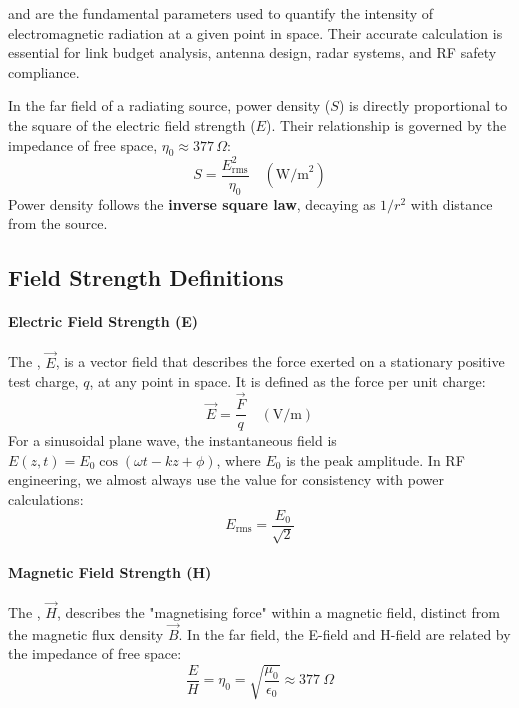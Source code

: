  and  are the fundamental parameters used to quantify the intensity of electromagnetic radiation at a given point in space. Their accurate calculation is essential for link budget analysis, antenna design, radar systems, and RF safety compliance.

\begin{keyconcept}
    In the far field of a radiating source, power density ($S$) is directly proportional to the square of the electric field strength ($E$). Their relationship is governed by the impedance of free space, $\eta_0 \approx 377\,\Omega$:
    \[
        S = \frac{E_{\text{rms}}^2}{\eta_0} \quad (\text{W/m}^2)
    \]
    Power density follows the \textbf{inverse square law}, decaying as $1/r^2$ with distance from the source.
\end{keyconcept}

\subsection{Field Strength Definitions}

\paragraph{Electric Field Strength (E)}
The , $\vec{E}$, is a vector field that describes the force exerted on a stationary positive test charge, $q$, at any point in space. It is defined as the force per unit charge:
\begin{equation}
    \vec{E} = \frac{\vec{F}}{q} \quad (\text{V/m})
\end{equation}
For a sinusoidal plane wave, the instantaneous field is $E(z,t) = E_0 \cos(\omega t - kz + \phi)$, where $E_0$ is the peak amplitude. In RF engineering, we almost always use the  value for consistency with power calculations:
\begin{equation}
    E_{\text{rms}} = \frac{E_0}{\sqrt{2}}
\end{equation}

\paragraph{Magnetic Field Strength (H)}
The , $\vec{H}$, describes the "magnetising force" within a magnetic field, distinct from the magnetic flux density $\vec{B}$. In the far field, the E-field and H-field are related by the impedance of free space:
\begin{equation}
    \frac{E}{H} = \eta_0 = \sqrt{\frac{\mu_0}{\epsilon_0}} \approx 377~\Omega
\end{equation}

